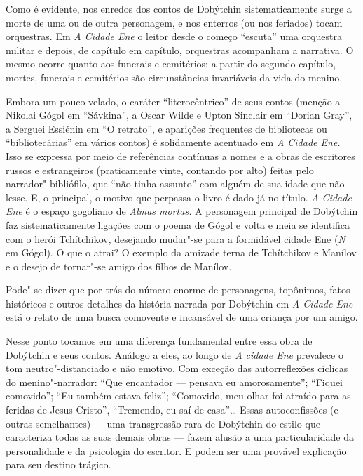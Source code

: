 Como é evidente, nos enredos dos contos de Dobýtchin sistematicamente
surge a morte de uma ou de outra personagem, e nos enterros (ou nos
feriados) tocam orquestras. Em \emph{A Cidade Ene} o leitor desde o
começo ``escuta'' uma orquestra militar e depois, de capítulo em
capítulo, orquestras acompanham a narrativa. O mesmo ocorre quanto aos
funerais e cemitérios: a partir do segundo capítulo, mortes, funerais e
cemitérios são circunstâncias invariáveis da vida do menino.

Embora um pouco velado, o caráter ``literocêntrico'' de seus contos
(menção a Nikolai Gógol em ``Sávkina'', a Oscar Wilde e Upton Sinclair
em ``Dorian Gray'', a Serguei Essiénin em ``O retrato'', e aparições
frequentes de bibliotecas ou ``bibliotecárias'' em vários contos) é
solidamente acentuado em \emph{A Cidade Ene.} Isso se expressa por meio
de referências contínuas a nomes e a obras de escritores russos e
estrangeiros (praticamente vinte, contando por alto) feitas pelo
narrador"-bibliófilo, que ``não tinha assunto'' com alguém de sua idade
que não lesse. E, o principal, o motivo que perpassa o livro é dado já
no título. \emph{A Cidade Ene} é o espaço gogoliano de \emph{Almas
mortas.} A personagem principal de Dobýtchin faz sistematicamente
ligações com o poema de Gógol e volta e meia se identifica com o herói
Tchítchikov, desejando mudar"-se para a formidável cidade Ene (\emph{N}
em Gógol). O que o atrai? O exemplo da amizade terna de Tchítchikov e
Manílov e o desejo de tornar"-se amigo dos filhos de Manílov.

Pode"-se dizer que por trás do número enorme de personagens, topônimos,
fatos históricos e outros detalhes da história narrada por Dobýtchin em
\emph{A Cidade Ene} está o relato de uma busca comovente e incansável de
uma criança por um amigo.

Nesse ponto tocamos em uma diferença fundamental entre essa obra de
Dobýtchin e seus contos. Análogo a eles, ao longo de \emph{A cidade Ene}
prevalece o tom neutro"-distanciado e não emotivo. Com exceção das
autorreflexões cíclicas do menino"-narrador: ``Que encantador --- pensava
eu amorosamente''; ``Fiquei comovido''; ``Eu também estava feliz'';
``Comovido, meu olhar foi atraído para as feridas de Jesus Cristo'',
``Tremendo, eu saí de casa''\ldots{} Essas autoconfissões (e outras
semelhantes) --- uma transgressão rara de Dobýtchin do estilo que
caracteriza todas as suas demais obras --- fazem alusão a uma
particularidade da personalidade e da psicologia do escritor. E podem
ser uma provável explicação para seu destino trágico.

